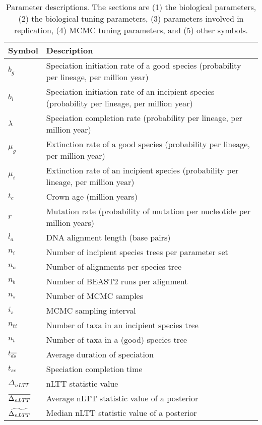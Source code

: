 \begin{table}
  \centering 
  \begin{tabular}{l l}
    \hline
    Symbol & Description \\
    \hline
    \hline
    $b_g$ & Speciation initiation rate of a good species (probability per lineage, per million year) \\
    $b_i$ & Speciation initiation rate of an incipient species (probability per lineage, per million year) \\
    $\lambda$ & Speciation completion rate (probability per lineage, per million year) \\
    $\mu_g$ & Extinction rate of a good species (probability per lineage, per million year) \\
    $\mu_i$ & Extinction rate of an incipient species (probability per lineage, per million year) \\
    \hline
    $t_c$ & Crown age (million years) \\
    $r$ & Mutation rate (probability of mutation per nucleotide per million years) \\
    $l_a$ & DNA alignment length (base pairs) \\
    \hline
    $n_i$ & Number of incipient species trees per parameter set \\
    $n_a$ & Number of alignments per species tree \\
    $n_b$ & Number of BEAST2 runs per alignment \\
    \hline
    $n_s$ & Number of MCMC samples \\
    $i_s$ & MCMC sampling interval \\
    \hline
    $n_{ti}$ & Number of taxa in an incipient species tree \\
    $n_{t}$ & Number of taxa in a (good) species tree \\
    $t_{\overline{ds}}$ & Average duration of speciation \\
    $t_{sc}$ & Speciation completion time \\
    $\Delta_{nLTT}$ & nLTT statistic value \\
    $\overline{\Delta_{nLTT}}$ & Average nLTT statistic value of a posterior \\
    $\widetilde{\Delta_{nLTT}}$ & Median nLTT statistic value of a posterior \\
    \hline
  \end{tabular}
  \caption{
    Parameter descriptions. The sections are (1) the biological parameters, (2) the
    biological tuning parameters, (3) parameters involved in replication, (4) MCMC
    tuning parameters, and (5) other symbols.
  }
  \label{table:parameter_descriptions}
\end{table}

